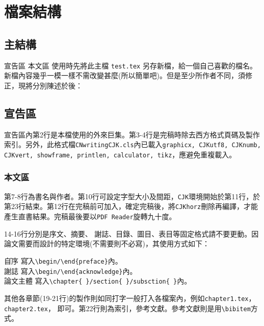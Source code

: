 \CJKhorz  %
\chapter{檔案結構}
\section{主結構}
  
宣告區  
本文區   
使用時先將此主檔 {\tt test.tex} 另存新檔，給一個自己喜歡的檔名。新檔內容幾乎一模一樣不需改變甚麼(所以簡單吧)。但是至少所作者不同，須修正，現將分別陳述於後： 

\section{宣告區}

宣告區內第2行是本檔使用的外來巨集。第3-4行是完稿時除去西方格式頁碼及製作索引。另外，此格式檔{\tt CNwritingCJK.cls}內已載入{\tt graphicx, CJKutf8, CJKnumb, CJKvert, showframe, printlen, calculator, tikz}，應避免重複載入。
\subsection{本文區}

第7-8行為書名與作者。第10行可設定字型大小及間距，{\tt CJK}環境開始於第11行，於第23行結束。第12行在完稿前可加入，確定完稿後，將{\tt CJKhorz}刪除再編譯，才能產生直書結果。{\color{red}完稿最後要以{\tt PDF Reader}旋轉九十度}。

14-16行分別是序文、摘要、 謝誌、目錄、圖目、表目等固定格式請不要更動。因論文需要而設計的特定環境(不需要則不必寫)，其使用方式如下：
\begin{tabbing}
\hspace{1cm} \=  自序 \hspace{1cm} \=   寫入{\tt \textbackslash begin/\textbackslash end\{preface\}}內。\\[5pt]
                        \>  謝誌                          \>  寫入{\tt \textbackslash begin/\textbackslash end\{acknowledge\}}內。\\[5pt]
                        \>  論文主體                  \>  寫入{\tt \textbackslash chapter\{~\}/section\{~\}/subsction\{~\}}內。
\end{tabbing}
其他各章節(19-21行)的製作則如同打字一般打入各檔案內，例如{\tt chapter1.tex}，{\tt chapter2.tex}，
即可。第22行則為索引，參考文獻。參考文獻則是用\verb+\bibitem+方式。   

